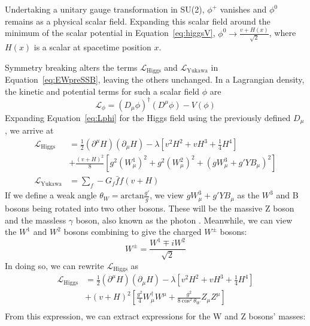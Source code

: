 Undertaking a unitary gauge transformation in SU(2), $\phi^+$ vanishes and $\phi^0$ remains as a physical scalar field.
Expanding this scalar field around the minimum of the scalar potential in Equation~\ref{eq:higgsV}, $\phi^0 \rightarrow \frac{v+H(x)}{\sqrt{2}}$, where $H(x)$ is a scalar at spacetime position $x$.

Symmetry breaking alters the terms $\mathcal{L}_\mathrm{Higgs}$ and $\mathcal{L}_\mathrm{Yukawa}$ in Equation~\ref{eq:EWpreSSB}, leaving the others unchanged. In a Lagrangian density, the kinetic and potential terms for such a scalar field $\phi$ are
\begin{equation}
\mathcal{L}_\phi = (D_\mu\phi)^\dagger(D^\mu\phi) - V(\phi) \label{eq:Lphi}
\end{equation}
Expanding Equation~\ref{eq:Lphi} for the Higgs field using the previously defined $D_\mu$,
we arrive at
\begin{equation}
\begin{split}
\mathcal{L}_\mathrm{Higgs} & = \frac{1}{2} (\partial^\mu H) (\partial_\mu H) - \lambda\left[ v^2H^2 + vH^3 + \frac{1}{4}H^4\right] \\
& + \frac{(v+H)^2}{8} \left[ g^2(W^1_\mu)^2 + g^2(W^2_\mu)^2  + \left( gW^3_\mu + g' Y B_\mu \right)^2 \right]  \\
\mathcal{L}_\mathrm{Yukawa}  & = \sum_f -G_f \bar{f} f (v+H)
\end{split}
\end{equation}
If we define a weak angle $\theta_W = \mathrm{arctan}\frac{g'}{g}$, 
we view $gW^3_\mu + g' Y B_\mu$ as the $W^3$ and B bosons being rotated into two other bosons. 
These will be the massive Z boson and the massless $\gamma$ boson, also known as the photon \cite{Weinberg1967}.
Meanwhile, we can view the $W^1$ and $W^2$ bosons combining to give the charged $W^\pm$ bosons:
\begin{equation}
W^\pm = \frac{W^1 \mp iW^2}{\sqrt{2}} \label{eq:WpmW12}
\end{equation}
In doing so, we can rewrite $\mathcal{L}_\mathrm{Higgs}$ as
\begin{equation}
\label{eq:LhiggsWZ}
\begin{split}
\mathcal{L}_\mathrm{Higgs} & = \frac{1}{2} (\partial^\mu H) (\partial_\mu H) - \lambda\left[ v^2H^2 + vH^3 + \frac{1}{4}H^4\right] \\
& + (v+H)^2 \left[ \frac{g^2}{4} W^\dagger_\mu W^\mu  + \frac{g^2}{8\:\mathrm{cos}^2\:\theta_W} Z_\mu Z^\mu \right]  \\
\end{split}
\end{equation}
From this expression, we can extract expressions for the W and Z bosons' masses:

